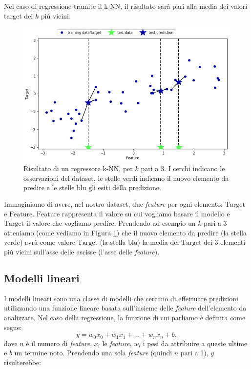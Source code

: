\documentclass[12pt,italian]{report}
\begin{document}
Nel caso di regressione tramite il k-NN, il risultato sarà pari alla media dei valori target dei $ k $ più vicini.
\begin{figure}[h!]
	\center
	\includegraphics[scale=0.6]{../img/knn_regressor}
	\caption{Risultato di un regressore k-NN, per $k$ pari a 3. I cerchi indicano le osservazioni del dataset, le stelle verdi indicano il nuovo elemento da predire e le stelle blu gli esiti della predizione.}
	\label{fig:knn_regressor}
\end{figure}
Immaginiamo di avere, nel nostro dataset, due \emph{feature} per ogni elemento: $ \mathrm{Target} $ e $ \mathrm{Feature} $. $ \mathrm{Feature} $ rappresenta il valore su cui vogliamo basare il modello e $ \mathrm{Target} $ il valore che vogliamo predire. Prendendo ad esempio un $ k $ pari a 3 otteniamo (come vediamo in Figura \ref{fig:knn_regressor}) che il nuovo elemento da predire (la stella verde) avrà come valore $ \mathrm{Target} $ (la stella blu) la media dei $ \mathrm{Target} $ dei 3  elementi più vicini sull'asse delle ascisse (l'asse delle \emph{feature}).


\subsection{Modelli lineari}
I modelli lineari sono una classe di modelli che cercano di effettuare predizioni utilizzando una funzione lineare basata sull'insieme delle \emph{feature} dell'elemento da analizzare. 
Nel caso della regressione, la funzione di cui parliamo è definita come segue:
\[ y = w_{0}x_{0} + w_{1}x_{1} + ... + w_{n}x_{n} + b ,\]
dove $n$ è il numero di \emph{feature}, $x_{i}$ le \emph{feature}, $ w_{i} $ i pesi da attribuire a queste ultime e $ b $ un termine noto.
Prendendo una sola \emph{feature} (quindi $ n $ pari a 1), $ y $ risulterebbe:
\end{document}
